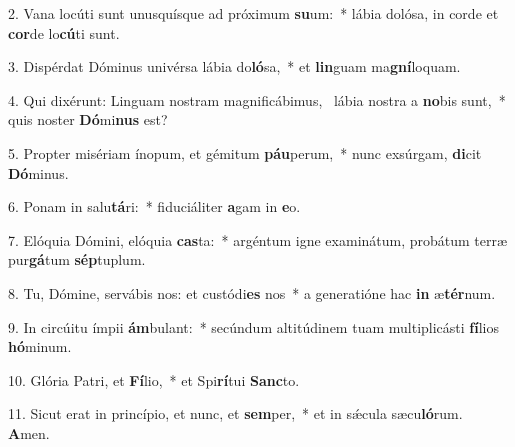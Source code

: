 2. Vana locúti sunt unusquísque ad próximum \textbf{su}um:~*  lábia dolósa, in corde et \textbf{cor}de lo\textbf{cú}ti sunt.\

3. Dispérdat Dóminus univérsa lábia do\textbf{ló}sa,~*  et \textbf{lin}guam ma\textbf{gní}loquam.\

4. Qui dixérunt: Linguam nostram magnificábimus, \dag\  lábia nostra a \textbf{no}bis sunt,~*  quis noster \textbf{Dó}mi\textbf{nus} est?\

5. Propter misériam ínopum, et gémitum \textbf{páu}perum,~*  nunc exsúrgam, \textbf{di}cit \textbf{Dó}minus.\

6. Ponam in salu\textbf{tá}ri:~*  fiduciáliter \textbf{a}gam in \textbf{e}o.\

7. Elóquia Dómini, elóquia \textbf{cas}ta:~*  argéntum igne examinátum, probátum terræ pur\textbf{gá}tum \textbf{sép}tuplum.\

8. Tu, Dómine, servábis nos: et custódi\textbf{es} nos~*  a generatióne hac \textbf{in} æ\textbf{tér}num.\

9. In circúitu ímpii \textbf{ám}bulant:~*  secúndum altitúdinem tuam multiplicásti \textbf{fí}lios \textbf{hó}minum.\

10. Glória Patri, et \textbf{Fí}lio,~*  et Spi\textbf{rí}tui \textbf{Sanc}to.\

11. Sicut erat in princípio, et nunc, et \textbf{sem}per,~*  et in sǽcula sæcu\textbf{ló}rum. \textbf{A}men.\

